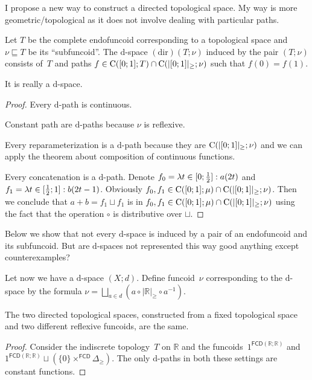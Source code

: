 I propose a new way to construct a directed topological space. My way is more geometric/topological as it does not involve dealing with particular paths.

\begin{defn}
Let $ T$ be the complete endofuncoid corresponding to a topological space
and $\nu\sqsubseteq T$ be its ``subfuncoid''. The $\mathrm{d}$-space $\operatorname{(dir)}(T;\nu)$ induced by the pair $(T;\nu)$
consists of~$ T$ and paths $f\in\mathrm{C}([0;1]; T) \cap \mathrm{C}(|[0;1]|_{\geq}; \nu)$
such that $f(0)=f(1)$.
\end{defn}

\begin{prop}
It is really a $\mathrm{d}$-space.
\end{prop}

\begin{proof}
Every $\mathrm{d}$-path is continuous.

Constant path are $\mathrm{d}$-paths because $\nu$ is reflexive.

Every reparameterization is a $\mathrm{d}$-path because they are $\mathrm{C}(|[0;1]|_{\geq}; \nu)$ and we can apply the theorem about
composition of continuous functions.

Every concatenation is a $\mathrm{d}$-path. Denote
$f_0 = \lambda t\in[0;\frac{1}{2}]:a(2t)$ and $f_1 = \lambda t\in[\frac{1}{2};1]:b(2t-1)$.
Obviously $f_0,f_1 \in \mathrm{C}([0;1];\mu) \cap \mathrm{C}(|[0;1]|_{\geq}; \nu)$.
Then we conclude that $a+b = f_1\sqcup f_1$ is in $f_0,f_1 \in \mathrm{C}([0;1];\mu) \cap \mathrm{C}(|[0;1]|_{\geq}; \nu)$
using the fact that the operation $\circ$ is distributive over $\sqcup$.
\end{proof}

Below we show that not every $\mathrm{d}$-space is induced by a pair of an endofuncoid and its subfuncoid.
But are $\mathrm{d}$-spaces not represented this way good anything except counterexamples?

Let now we have a $\mathrm{d}$-space $(X;d)$. Define funcoid~$\nu$ corresponding to the $\mathrm{d}$-space by the formula
$\nu = \bigsqcup_{a\in d}(a\circ |\mathbb{R}|_{\geq}\circ a^{-1})$.

\begin{example}
The two directed topological spaces, constructed from a fixed topological space and two different reflexive funcoids,
are the same.
\end{example}

\begin{proof}
Consider the indiscrete topology~$T$ on $\mathbb{R}$ and the funcoids~$1^{\mathsf{FCD}(\mathbb{R};\mathbb{R})}$
and $1^{\mathsf{FCD}(\mathbb{R};\mathbb{R})}\sqcup(\{0\}\times^{\mathsf{FCD}} \Delta_{\geq})$.
The only $\mathrm{d}$-paths in both these settings are constant functions.
\end{proof}

